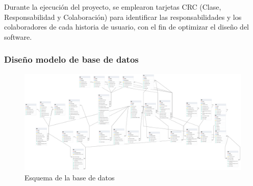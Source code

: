 Durante la ejecución del proyecto, se emplearon tarjetas CRC (Clase, Responsabilidad y Colaboración) para
identificar las responsabilidades y los colaboradores de cada historia de usuario, con el fin de optimizar
el diseño del software.



\begin{landscape}
      \subsubsection{Diseño modelo de base de datos}
      \begin{figure}[H]
            \centering
            \includegraphics[width=1.7\textwidth]{chapters/III-resultados-y-discusion/resources/images/migracion-base-datos.png}
            \caption{Esquema de la base de datos}
            \label{fig:migracion-base-datos}
      \end{figure}
\end{landscape}





